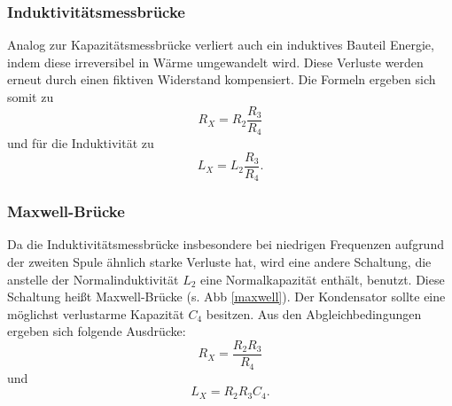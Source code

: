 \subsubsection{Induktivitätsmessbrücke}
Analog zur Kapazitätsmessbrücke verliert auch ein induktives Bauteil Energie, indem diese irreversibel in Wärme umgewandelt wird. 
Diese Verluste werden erneut durch einen fiktiven Widerstand kompensiert.%
Die Formeln ergeben sich somit zu 
\begin{equation}
    R_X = R_2 \frac{R_3}{R_4}
    \label{eqn:c_r}
\end{equation}
und für die Induktivität zu 
\begin{equation}
    L_X = L_2 \frac{R_3}{R_4}.
    \label{eqn:c_l}
\end{equation}

\subsubsection{Maxwell-Brücke}
Da die Induktivitätsmessbrücke insbesondere bei niedrigen Frequenzen aufgrund der zweiten Spule ähnlich starke Verluste hat, 
wird eine andere Schaltung, die anstelle der Normalinduktivität $L_2$ eine Normalkapazität enthält, benutzt.
Diese Schaltung heißt Maxwell-Brücke (s. Abb \ref{maxwell}).
Der Kondensator sollte eine möglichst verlustarme Kapazität $C_4$ besitzen. 
Aus den Abgleichbedingungen ergeben sich folgende Ausdrücke:
\begin{equation}
     R_X = \frac{R_2R_3}{R_4}
     \label{eqn:d_r}
\end{equation}
und 
\begin{equation}
    L_X = R_2R_3C_4.
    \label{eqn:d_l}
\end{equation}


